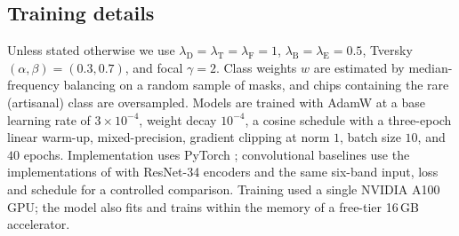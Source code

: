 \documentclass[review]{elsarticle}
\begin{document}
\subsection{Training details}\label{sec:training}
Unless stated otherwise we use
$\lambda_{\mathrm{D}}=\lambda_{\mathrm{T}}=\lambda_{\mathrm{F}}=1$,
$\lambda_{\mathrm{B}}=\lambda_{\mathrm{E}}=0.5$, Tversky $(\alpha,\beta)=(0.3,0.7)$, and
focal $\gamma=2$. Class weights $w$ are estimated by median-frequency balancing on a random
sample of masks, and chips containing the rare (artisanal) class are oversampled. Models are
trained with AdamW \citep{loshchilov2019adamw} at a base learning rate of
$3\times10^{-4}$, weight decay $10^{-4}$, a cosine schedule \citep{loshchilov2017sgdr} with a
three-epoch linear warm-up, mixed-precision, gradient clipping at norm $1$, batch size
$10$, and $40$ epochs. Implementation uses PyTorch \citep{paszke2019pytorch}; convolutional
baselines use the implementations of \cite{iakubovskii2019smp} with ResNet-34 encoders
\citep{he2016resnet} and the same six-band input, loss and schedule for a controlled
comparison. Training used a single NVIDIA A100
GPU; the model also fits and trains within the memory of a free-tier 16\,GB accelerator.
\end{document}
